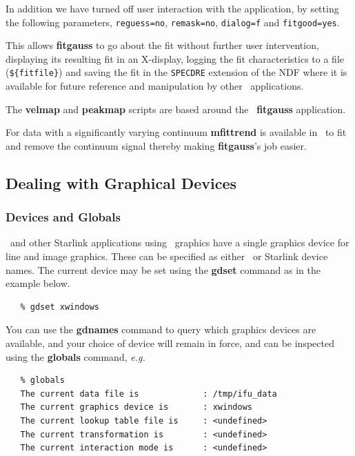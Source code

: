 \documentclass[twoside,11pt]{article}
\newcommand{\xref}[3]{#1}
\newcommand{\xlabel}[1]{}
\begin{document}
{In addition we have turned off user interaction with the application,
by setting the following parameters, \verb+reguess=no+,
\verb+remask=no+, \verb+dialog=f+ and \verb+fitgood=yes+.

This allows {\bf fitgauss} to go about the fit without further user
intervention, displaying its resulting fit in an X-display, logging
the fit characteristics to a file (\verb+${fitfile}+) and saving the
fit in the \xref{{\tt SPECDRE} extension}{sun86}{extension}
 of the NDF where it is available
for future reference and manipulation by other \SPECDRE\ applications.

The \xref{{\bf velmap}}{sun237}{velmap} and \xref{{\bf
peakmap}}{sun237}{peakmap} scripts are based around the \SPECDRE\
{\bf fitgauss} application.

For data with a significantly varying continuum \xref{{\bf
mfittrend}}{sun95}{MFITTREND} is available in \KAPPA\ to fit and
remove the continuum signal thereby making {\bf fitgauss}'s job easier.

\subsection{\label{sc16_graphics}Dealing with Graphical Devices\xlabel{sc16_graphics}}

\subsubsection{Devices and Globals}

\KAPPAref\ and other Starlink applications using \PGPLOTref\ graphics
have a single \xref{graphics device}{sun95}{se_graphdev} for line and
image graphics.  These can be specified as either \xref{\PGPLOT\ or
Starlink device names}{sun95}{se_selgradev}.  The current device may
be set using the \xref{{\bf gdset}}{sun95}{GDSET} command as in the example
below.

\small\begin{verbatim}
   % gdset xwindows
\end{verbatim}\normalsize

You can use the \xref{{\bf gdnames}}{sun95}{GDNAMES} command to query which
graphics devices are available, and your choice of device will remain
in force, and can be inspected using the
\xref{{\bf globals}}{sun95}{GLOBALS} command, \emph{e.g.}\

\small\begin{verbatim}
   % globals
   The current data file is             : /tmp/ifu_data
   The current graphics device is       : xwindows
   The current lookup table file is     : <undefined>
   The current transformation is        : <undefined>
   The current interaction mode is      : <undefined>
\end{verbatim}\normalsize

}
\end{document}
